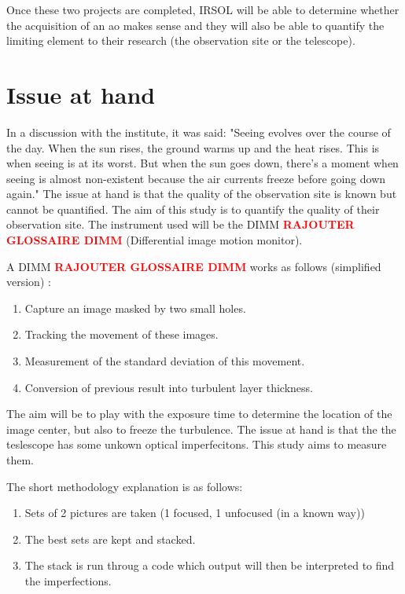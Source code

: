Once these two projects are completed, IRSOL will be able to determine whether the acquisition of an \acrfull{ao} makes sense
and they will also be able to quantify the limiting element to their research (the observation site or the telescope).



\section{Issue at hand}
In a discussion with the institute, it was said: "Seeing evolves over the course of the day.
When the sun rises, the ground warms up and the heat rises. This is when seeing is at its worst.
But when the sun goes down, there's a moment when seeing is almost non-existent because the air currents freeze before going down again."
\bigbreak
The issue at hand is that the quality of the observation site is known but cannot be quantified.
The aim of this study is to quantify the quality of their observation site.
The instrument used will be the DIMM \textbf{\textcolor{red}{RAJOUTER GLOSSAIRE DIMM}} (Differential image motion monitor).

A DIMM \textbf{\textcolor{red}{RAJOUTER GLOSSAIRE DIMM}} works as follows (simplified version) :
\begin{enumerate}
    \item Capture an image masked by two small holes.
    \item Tracking the movement of these images.
    \item Measurement of the standard deviation of this movement.
    \item Conversion of previous result into turbulent layer thickness.
\end{enumerate}
The aim will be to play with the exposure time to determine the location of the image center, but also to freeze the turbulence.
\bigbreak
The issue at hand is that the the teslescope has some unkown optical imperfecitons. This study aims to measure them.

The short methodology explanation is as follows:
\begin{enumerate}
    \item Sets of 2 pictures are taken (1 focused, 1 unfocused (in a known way))
    \item The best sets are kept and stacked.
    \item The stack is run throug a code which output will then be interpreted to find the imperfections.
\end{enumerate}

